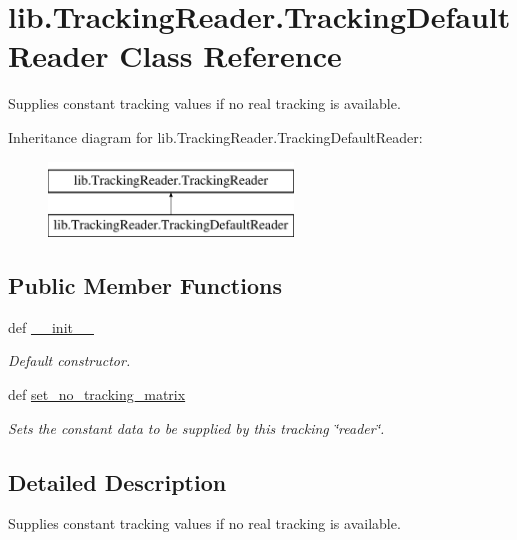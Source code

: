 \hypertarget{classlib_1_1TrackingReader_1_1TrackingDefaultReader}{\section{lib.\-Tracking\-Reader.\-Tracking\-Default\-Reader \-Class \-Reference}
\label{classlib_1_1TrackingReader_1_1TrackingDefaultReader}
}


\-Supplies constant tracking values if no real tracking is available.  


\-Inheritance diagram for lib.\-Tracking\-Reader.\-Tracking\-Default\-Reader\-:\begin{figure}[H]
\begin{center}
\leavevmode
\includegraphics[height=2.000000cm]{classlib_1_1TrackingReader_1_1TrackingDefaultReader}
\end{center}
\end{figure}
\subsection*{\-Public \-Member \-Functions}
\begin{DoxyCompactItemize}
\item 
def \hyperlink{classlib_1_1TrackingReader_1_1TrackingDefaultReader_a150b9e434a661b47942beebf890f162c}{\-\_\-\-\_\-init\-\_\-\-\_\-}
\begin{DoxyCompactList}\small\item\em \-Default constructor. \end{DoxyCompactList}\item 
def \hyperlink{classlib_1_1TrackingReader_1_1TrackingDefaultReader_acd744a10e381c6c7253e5f84bac208d6}{set\-\_\-no\-\_\-tracking\-\_\-matrix}
\begin{DoxyCompactList}\small\item\em \-Sets the constant data to be supplied by this tracking \char`\"{}reader\char`\"{}. \end{DoxyCompactList}\end{DoxyCompactItemize}


\subsection{\-Detailed \-Description}
\-Supplies constant tracking values if no real tracking is available. 



